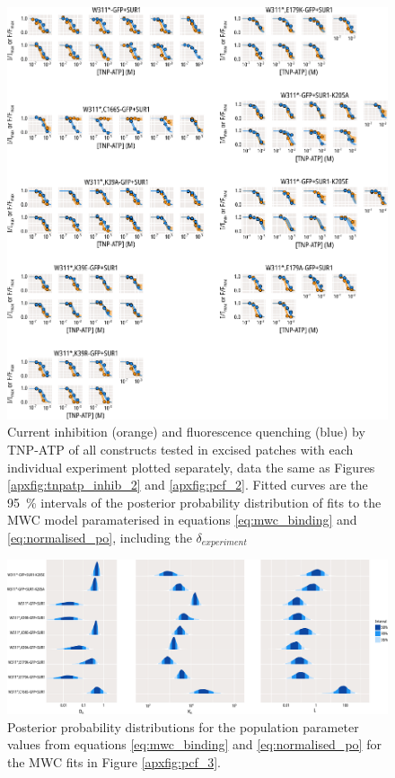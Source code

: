 \begin{figure}[h]
	\centering
	\includegraphics[width=\textwidth]{all_pcf_fits_2.pdf}
	\caption[MWC sample fits]{
	Current inhibition (orange) and fluorescence quenching (blue) by TNP-ATP of all constructs tested in excised patches with each individual experiment plotted separately, data the same as Figures \ref{apxfig:tnpatp_inhib_2} and \ref{apxfig:pcf_2}.
	Fitted curves are the \SI{95}{\percent} intervals of the posterior probability distribution of fits to the MWC model paramaterised in equations \ref{eq:mwc_binding} and \ref{eq:normalised_po}, including the $\delta_{experiment}$
	}
	\label{apxfig:pcf_4}
\end{figure}

\begin{figure}[h]
	\centering
	\includegraphics[width=\textwidth,angle=90,origin=c]{all_pcf_params_1.pdf}
	\caption[MWC parameter posterior distributions]{
	Posterior probability distributions for the population parameter values from equations \ref{eq:mwc_binding} and \ref{eq:normalised_po} for the MWC fits in Figure \ref{apxfig:pcf_3}.
	}
	\label{apxfig:mwc_params}
\end{figure}

